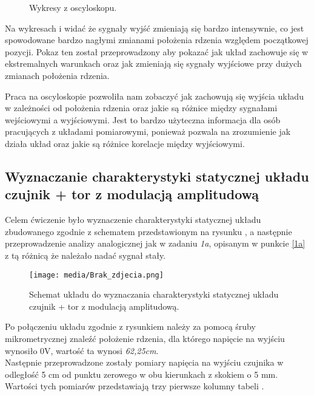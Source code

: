 \documentclass{article}
\begin{document}
\begin{figure}[!ht]
    \centering

    \caption{Wykresy z oscyloskopu.}
    \label{fig:main1}
\end{figure}


\vspace{1em}
Na wykresach  i  widać że sygnały wyjść zmieniają się bardzo intensywnie, co jest spowodowane bardzo nagłymi zmianami położenia rdzenia względem początkowej pozycji. Pokaz ten został przeprowadzony aby pokazać jak układ zachowuje się w ekstremalnych warunkach oraz jak zmieniają się sygnały wyjściowe przy dużych zmianach położenia rdzenia.

\vspace{1em}
Praca na oscyloskopie pozwoliła nam zobaczyć jak zachowują się wyjścia układu w zależności od położenia rdzenia oraz jakie są różnice między sygnałami wejściowymi a wyjściowymi. Jest to bardzo użyteczna informacja dla osób pracujących z układami pomiarowymi, ponieważ pozwala na zrozumienie jak działa układ oraz jakie są różnice korelacje między wyjściowymi.
\newpage
\subsection{Wyznaczanie charakterystyki statycznej układu czujnik + tor z modulacją amplitudową}

Celem ćwiczenie było wyznaczenie charakterystyki statycznej układu zbudowanego zgodnie z schematem przedstawionym na rysunku , a następnie przeprowadzenie analizy analogicznej jak w zadaniu \textit{1a}, opisanym w punkcie \ref{1a} z tą różnicą że należało nadać sygnał stały.

\begin{figure}[ht]
    \centering
    \texttt{[image: media/Brak\_zdjecia.png]}
    \caption{Schemat układu do wyznaczania charakterystyki statycznej układu czujnik + tor z modulacją amplitudową.}
    \label{fig6}
\end{figure}
\newpage
Po połączeniu układu zgodnie z rysunkiem  należy za pomocą śruby mikrometrycznej znaleźć położenie rdzenia, dla którego napięcie na wyjściu wynosiło 0V, wartość ta wynosi \textit{62,25cm}.\\Następnie przeprowadzone zostały pomiary napięcia na wyjściu czujnika w odległość 5 cm od punktu zerowego w obu kierunkach z skokiem o 5 mm. Wartości tych pomiarów przedstawiają trzy pierwsze kolumny tabeli .
\end{document}
